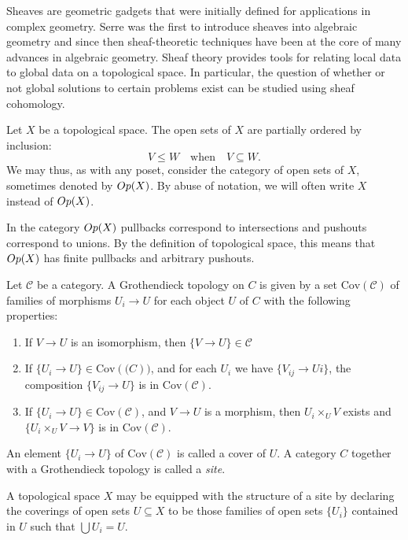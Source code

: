 Sheaves are geometric gadgets that were initially defined for applications in complex geometry. Serre was the first to introduce sheaves into algebraic geometry and since then sheaf-theoretic techniques have been at the core of many advances in algebraic geometry.  Sheaf theory provides tools for relating local data to global data on a topological space. In particular, the question of whether or not global solutions to certain problems exist can be studied using sheaf cohomology. 


\begin{construction}\label{def:opens}
  Let $X$ be a topological space. The open sets of $X$ are partially ordered by inclusion: \[V \le W \quad \text{when} \quad V \subseteq W.\]
  We may thus, as with any poset, consider the category of open sets of $X$, sometimes denoted by $Op(X)$. By abuse of notation, we will often write $X$ instead of $Op(X)$.
\end{construction}
\begin{remark}
 In the category $Op(X)$ pullbacks correspond to intersections and pushouts correspond to unions. By the definition of topological space, this means that $Op(X)$ has finite pullbacks and arbitrary pushouts. 
\end{remark}

\begin{definition}
	Let $\mathcal{C}$ be a category. A Grothendieck topology on $C$ is given by a set $\text{Cov}(\mathcal{C})$ of families of morphisms ${U_i \to U}$ for each object $U$ of $C$ with the following properties:
	\begin{enumerate}
		\item If $V \to U$ is an isomorphism, then $\{V \to U\} \in \mathcal{C}$
		\item If $\{U_i \to U\} \in \text{Cov}(\mathcal(C))$, and for each $U_i$ we have $\{V_{ij} \to Ui\}$, the composition $\{V_{ij} \to U\}$ is in $\text{Cov}(\mathcal{C})$.
		\item If $\{U_i \to U\} \in \text{Cov}(\mathcal{C})$, and $V \to U$ is a morphism, then $U_i \times_U V$ exists and 
		$\{U_i \times_U V \to V\}$ is in $\text{Cov}(\mathcal{C})$.
	\end{enumerate}	
	An element $\{U_i \to U\}$ of $\text{Cov}(\mathcal{C})$ is called a cover of $U$. A category $C$ together with a Grothendieck topology is called a \textit{site}.
\end{definition}
\begin{remark}
	A topological space $X$ may be equipped with the structure of a site by declaring the coverings of open sets $U \subseteq X$ to be those families of open sets $\{U_i\}$ contained in $U$ such that $\bigcup U_i = U$.
\end{remark}


